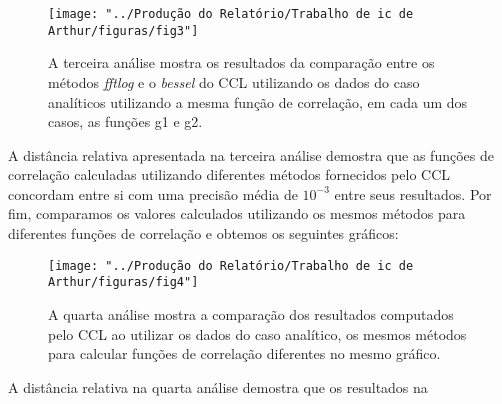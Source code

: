 \begin{figure}[h]
	\centering
	\texttt{[image: "../Produção do Relatório/Trabalho de ic de Arthur/figuras/fig3"]}
	\caption{A terceira análise mostra os resultados da comparação entre os métodos \textit{fftlog} e o \textit{bessel} do CCL utilizando os dados do caso analíticos utilizando a mesma função de correlação, em cada um dos casos, as funções g1 e g2.}
	\label{fig:fig3}
\end{figure}

A distância relativa apresentada na terceira análise demostra que as funções de correlação calculadas utilizando diferentes métodos fornecidos pelo CCL concordam entre si com uma precisão média de $ 10^{-3} $ entre seus resultados. Por fim, comparamos os valores calculados utilizando os mesmos métodos para diferentes funções de correlação e obtemos os seguintes gráficos:

\begin{figure}[H]
	\centering
	\texttt{[image: "../Produção do Relatório/Trabalho de ic de Arthur/figuras/fig4"]}
	\caption{A quarta análise mostra a comparação dos resultados computados pelo CCL ao utilizar os dados do caso analítico, os mesmos métodos para calcular funções de correlação diferentes no mesmo gráfico.}
	\label{fig:fig4}
\end{figure}

A distância relativa na quarta análise demostra que os resultados na 






